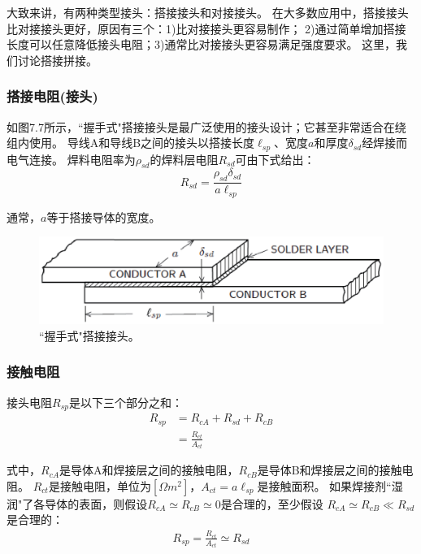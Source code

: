大致来讲，有两种类型接头：搭接接头和对接接头。
在大多数应用中，搭接接头比对接接头更好，原因有三个：1)比对接接头更容易制作；
2)通过简单增加搭接长度可以任意降低接头电阻；3)通常比对接接头更容易满足强度要求。
这里，我们讨论搭接拼接。

\subsubsection*{搭接电阻(接头)}
如图7.7所示，``握手式"搭接接头是最广泛使用的接头设计；它甚至非常适合在绕组内使用。
导线A和导线B之间的接头以搭接长度$\ell_{sp}$、宽度$a$和厚度$\delta_{sd}$经焊接而电气连接。
焊料电阻率为$\rho_{sd}$的焊料层电阻$R_{sd}$可由下式给出：
\begin{equation}%
R_{sd}=\frac{\rho_{sd}\delta_{sd}}{a\ell_{sp}}
\end{equation}

通常，$a$等于搭接导体的宽度。
\begin{figure}[htbp]
	\centering
	\includegraphics[scale=0.6]{chpt7/figs/fig7.7.eps}
	\caption{``握手式"搭接接头。}
\end{figure}

\subsubsection*{接触电阻}
接头电阻$R_{sp}$是以下三个部分之和：
\begin{subequations}
	\begin{align}
R_{sp}&=R_{cA}+R_{sd}+R_{cB} \\
&=\frac{R_{ct}}{A_{ct}}
	\end{align}
\end{subequations}

式中，$R_{cA}$是导体A和焊接层之间的接触电阻，$R_{cB}$是导体B和焊接层之间的接触电阻。
$R_{ct}$是接触电阻，单位为$[\Omega m^2]$，$A_{ct}=a\ell_{sp}$是接触面积。
如果焊接剂``湿润"了各导体的表面，则假设$R_{cA}\simeq R_{cB}\simeq 0$是合理的，至少假设
$R_{cA}\simeq R_{cB}\ll R_{sd}$是合理的：
\begin{align*}%
R_{sp}=\frac{R_{ct}}{A_{ct}}\simeq R_{sd} \tag{7.9c}
\end{align*}

